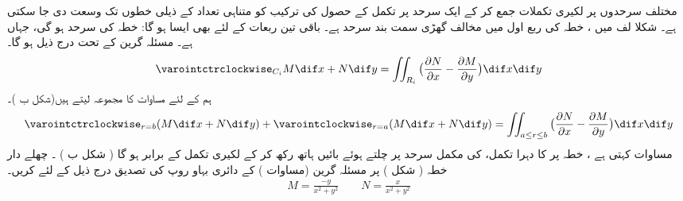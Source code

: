    مختلف سرحدوں پر لکیری تکملات  جمع کر کے ایک سرحد پر تکمل کے حصول کی ترکیب  کو متناہی تعداد کے ذیلی خطوں تک وسعت دی جا سکتی ہے۔ شکلا لف میں ، خطہ   کی   ربع اول  میں  مخالف گھڑی سمت بند سرحد    ہے۔ باقی تین  ربعات کے لئے بھی ایسا ہو گا:    خطہ  کی سرحد   ہو گی، جہاں    ہے۔ مسئلہ  گرین کے تحت  درج ذیل ہو گا۔ 
\begin{align}\label{مساوات_سمتی_تکمل_چار_حصے}
     \varointctrclockwise_{C_i} M \dif x + N \dif y = \iint_{R_i} \big(\frac{\partial N}{\partial x} -  \frac{\partial M}{\partial y}\big) \dif x \dif y 
\end{align}
 ہم  کے لئے  مساوات      کا مجموعہ  لیتے ہیں(شکل     ب )۔
\begin{align}\label{مساوات_سمتی_تکمل_چار_مجموعہ}
     \varointctrclockwise_{r=b} (M \dif x + N \dif y) + \varointclockwise_{r=a} (M \dif x + N \dif y) = \iint_{a\leq r \leq b} \big(\frac{\partial N}{\partial x} -  \frac{\partial M}{\partial y}\big) \dif x \dif y 
\end{align}
 مساوات      کہتی ہے   ،  خطہ 
  پر   کا دہرا  تکمل،   کی مکمل  سرحد پر چلتے ہوئے  بائیں ہاتھ رکھ کر   کے   لکیری تکمل   کے برابر ہو گا  ( شکل      ب   )  ۔
 چھلے دار  خطہ  ( شکل    ) پر  مسئلہ  گرین (مساوات      ) کے  دائری بہاو روپ کی تصدیق  درج ذیل کے لئے کریں۔
\begin{align*}
  M = \frac{-y}{x^2 + y^2} \quad\quad N=\frac{x}{x^2 + y^2}  
\end{align*}

